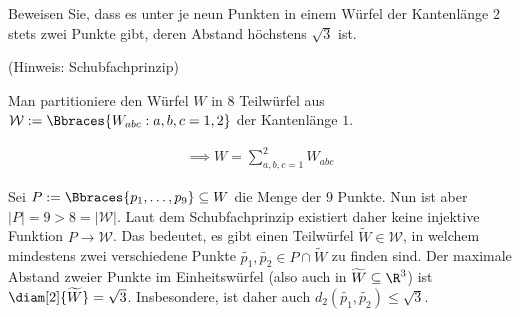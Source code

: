 
\begin{exercise}

Beweisen Sie, dass es unter je neun Punkten in einem Würfel der Kantenlänge $2$ stets zwei Punkte gibt, deren Abstand höchstens $\sqrt{3}$ ist.

(Hinweis: Schubfachprinzip)

\end{exercise}


\begin{solution}

Man partitioniere den Würfel $W$ in $8$ Teilwürfel aus $\mathcal{W} := \Bbraces{W_{abc}: a, b, c = 1, 2}$ der Kantenlänge $1$.

\begin{align*}
    \implies
    W = \sum_{a, b, c = 1}^2 W_{abc}
\end{align*}

Sei $P := \Bbraces{p_1, \dots, p_9} \subseteq W$ die Menge der $9$ Punkte.
Nun ist aber $|P| = 9 > 8 = |\mathcal{W}|$.
Laut dem Schubfachprinzip existiert daher keine injektive Funktion $P \to \mathcal{W}$.
Das bedeutet, es gibt einen Teilwürfel $\widetilde{W} \in \mathcal{W}$, in welchem mindestens zwei verschiedene Punkte $\widetilde{p_1}, \widetilde{p_2} \in P \cap \widetilde{W}$ zu finden sind.
Der maximale Abstand zweier Punkte im Einheitswürfel (also auch in $\widetilde{W} \subseteq \R^3$) ist $\diam[2]{\widetilde{W}} = \sqrt{3}$.
Insbesondere, ist daher auch $d_2(\widetilde{p_1}, \widetilde{p_2}) \leq \sqrt{3}$.

\end{solution}

